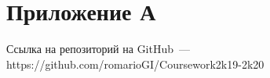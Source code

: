 \section*{Приложение А}

	Ссылка на репозиторий на GitHub~--- https://github.com/romarioGI/Coursework2k19-2k20	